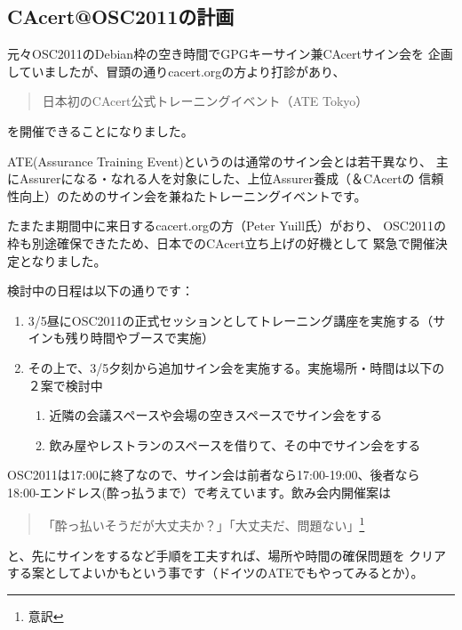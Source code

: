 \documentclass[mingoth,a4paper]{jsarticle}
\begin{document}
\subsection{CAcert@OSC2011の計画}
元々OSC2011のDebian枠の空き時間でGPGキーサイン兼CAcertサイン会を
企画していましたが、冒頭の通りcacert.orgの方より打診があり、
\begin{quote}
\Large{日本初のCAcert公式トレーニングイベント（ATE Tokyo）}
\end{quote}
を開催できることになりました。

ATE(Assurance Training Event)というのは通常のサイン会とは若干異なり、
主にAssurerになる・なれる人を対象にした、上位Assurer養成（＆CAcertの
信頼性向上）のためのサイン会を兼ねたトレーニングイベントです。

たまたま期間中に来日するcacert.orgの方（Peter Yuill氏）がおり、
OSC2011の枠も別途確保できたため、日本でのCAcert立ち上げの好機として
緊急で開催決定となりました。

検討中の日程は以下の通りです：
\begin{enumerate}
\item 3/5昼にOSC2011の正式セッションとしてトレーニング講座を実施する（サインも残り時間やブースで実施）
\item その上で、3/5夕刻から追加サイン会を実施する。実施場所・時間は以下の２案で検討中
\begin{enumerate}
\item 近隣の会議スペースや会場の空きスペースでサイン会をする
\item 飲み屋やレストランのスペースを借りて、その中でサイン会をする
\end{enumerate}
\end{enumerate}

OSC2011は17:00に終了なので、サイン会は前者なら17:00-19:00、後者なら
18:00-エンドレス(酔っ払うまで）で考えています。飲み会内開催案は
\begin{quote}
\Large{「酔っ払いそうだが大丈夫か？」「大丈夫だ、問題ない」\footnote{意訳}}
\end{quote}
と、先にサインをするなど手順を工夫すれば、場所や時間の確保問題を
クリアする案としてよいかもという事です（ドイツのATEでもやってみるとか）。
\end{document}
